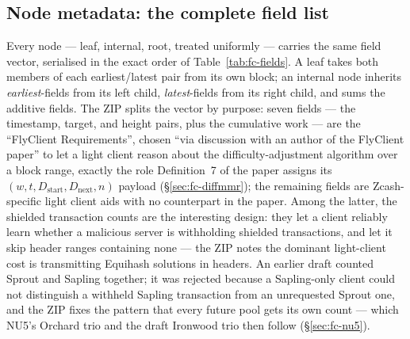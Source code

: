 \documentclass[11pt,a4paper]{article}
\theoremstyle{definition}
\begin{document}
\subsection{Node metadata: the complete field list}\label{sec:fc-fields}

Every node --- leaf, internal, root, treated uniformly --- carries the
same field vector, serialised in the exact order of
Table~\ref{tab:fc-fields}. A leaf takes both members of each
earliest/latest pair from its own block; an internal node inherits
\emph{earliest}-fields from its left child, \emph{latest}-fields from
its right child, and sums the additive fields. The ZIP splits the vector
by purpose: seven fields --- the timestamp, target, and height pairs,
plus the cumulative work --- are the ``FlyClient Requirements'', chosen
``via discussion with an author of the FlyClient paper'' to let a light
client reason about the difficulty-adjustment algorithm over a block
range, exactly the role Definition~7 of the paper assigns its
$(w, t, D_{\mathrm{start}}, D_{\mathrm{next}}, n)$ payload
(\S\ref{sec:fc-diffmmr}); the remaining fields are Zcash-specific light
client aids with no counterpart in the paper. Among the latter, the
shielded transaction counts are the interesting design: they let a
client reliably learn whether a malicious server is withholding
shielded transactions, and let it skip header ranges containing none ---
the ZIP notes the dominant light-client cost is transmitting Equihash
solutions in headers. An earlier draft counted Sprout and Sapling
together; it was rejected because a Sapling-only client could not
distinguish a withheld Sapling transaction from an unrequested Sprout
one, and the ZIP fixes the pattern that every future pool gets its own
count --- which NU5's Orchard trio and the draft Ironwood trio then
follow (\S\ref{sec:fc-nu5}).
\end{document}
